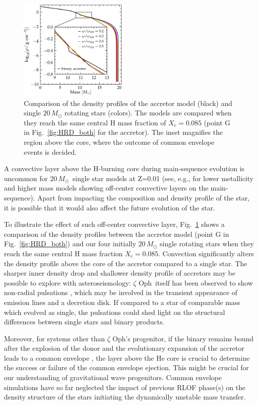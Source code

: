 \documentclass[twocolumn,twocolappendix,trackchanges]{aastex63}
\DeclareRobustCommand{\Figref}[1]{Fig.~\ref{#1}}
\newcommand{\zoph}{$\zeta$ Oph}
\newcommand{\Msun}{\ensuremath{\,M_\odot}}
\begin{document}
\begin{figure}[tbp]
  \includegraphics[width=0.47\textwidth]{rho_comparison}
  \caption{Comparison of the density profiles of the accretor model
    (black) and single $20\,M_\odot$ rotating stars (colors). The
    models are compared when they reach the same central H mass
    fraction of $X_c=0.085$ (point G in \Figref{fig:HRD_both} for the
    accretor). The inset magnifies the region above the core, where
    the outcome of common envelope events is decided.}
  \label{fig:rho}
\end{figure}

A convective layer above the H-burning core
during main-sequence evolution is uncommon for 20\Msun\ single star
models at Z=0.01 (see, e.g.,  \citealt{schootemeijer:19} for lower metallicity
and higher mass models showing off-center convective layers on the
main-sequence). Apart from impacting the composition and density
profile of the star, it is possible that it would also affect the
future evolution of the star.

To illustrate the effect of such off-center convective layer,
\Figref{fig:rho} shows a comparison of the density profiles between
the accretor model (point G in \Figref{fig:HRD_both}) and our four
initially $20\,M_\odot$ single rotating stars when they reach the same
central H mass fraction $X_c=0.085$. Convection
significantly alters the density profile above the core of the
accretor compared to a single star. The sharper inner density drop and
shallower density profile of accretors may be possible to explore with
asteroseismology: \zoph\ itself has been observed to show non-radial
pulsations \citep{walker:05}, which may be involved in the transient
appearance of emission lines and a decretion disk. If compared to a
star of comparable mass which evolved as single, the pulsations could
shed light on the structural differences between single stars and
binary products.

Moreover, for systems other than \zoph's progenitor, if the
binary remains bound after the explosion of the donor and the
evolutionary expansion of the accretor leads to a common envelope
\citep[e.g.,][]{paczynski:76}, the layer above the He core is crucial
to determine the success or failure of the common envelope
ejection. This might be
crucial for our understanding of gravitational wave
progenitors. Common envelope simulations have so far neglected the
impact of previous RLOF phase(s) on the density structure of the stars
initiating the dynamically unstable mass transfer.
\end{document}
